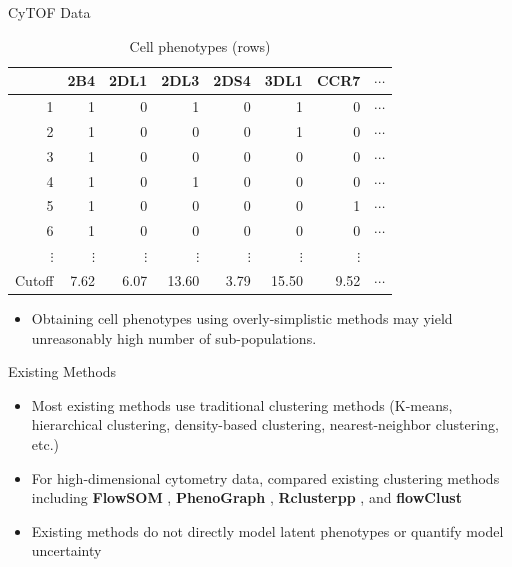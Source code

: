 \documentclass[ignorenonframetext,]{beamer}
\providecommand{\tightlist}{%
  \setlength{\itemsep}{0pt}\setlength{\parskip}{0pt}}
\begin{document}
\begin{frame}{CyTOF Data}

\begin{table}
\begin{tabular}{r|rrrrrrr}
  \hline
  & 2B4 & 2DL1 & 2DL3 & 2DS4 & 3DL1 & CCR7 & $\cdots$ \\
  \hline
  1 & 1 & 0 & 1 & 0 & 1 & 0 & $\cdots$ \\
  2 & 1 & 0 & 0 & 0 & 1 & 0 & $\cdots$ \\
  3 & 1 & 0 & 0 & 0 & 0 & 0 & $\cdots$ \\
  4 & 1 & 0 & 1 & 0 & 0 & 0 & $\cdots$ \\
  5 & 1 & 0 & 0 & 0 & 0 & 1 & $\cdots$ \\
  6 & 1 & 0 & 0 & 0 & 0 & 0  & $\cdots$ \\
  $\vdots$ & $\vdots$& $\vdots$& $\vdots$& $\vdots$& $\vdots$& $\vdots$& \\
  \hline
  Cutoff & 7.62 & 6.07 & 13.60 & 3.79 & 15.50 & 9.52 & $\cdots$\\
  \hline
\end{tabular}
\caption{Cell phenotypes (rows)}
\end{table}

\begin{itemize}
\tightlist
\item
  Obtaining cell phenotypes using overly-simplistic methods may yield
  unreasonably high number of sub-populations.
\end{itemize}

\end{frame}

\begin{frame}{Existing Methods}

\begin{itemize}
\setlength\itemsep{1em}
  \item Most existing methods use traditional clustering methods (K-means,
    hierarchical clustering, density-based clustering, nearest-neighbor
    clustering, etc.)
  \item For high-dimensional cytometry data, \cite{weber2016comparison}
    compared existing clustering methods including \textbf{FlowSOM}
    \citep{van2015flowsom}, \textbf{PhenoGraph} \citep{levine2015data}, 
    \textbf{Rclusterpp} \citep{linderman2013package}, 
    and \textbf{flowClust} \citep{lo2009flowclust}
  \item
    Existing methods do not directly model latent phenotypes or quantify model
    uncertainty
  \end{itemize}
\end{frame}
\end{document}
